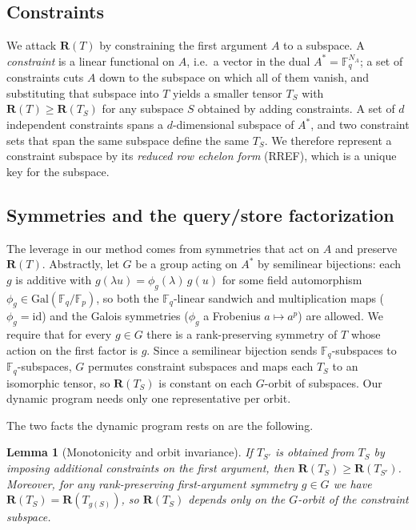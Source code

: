 \documentclass[11pt]{article}
\newtheorem{lemma}{Lemma}
\theoremstyle{definition}
\newcommand{\F}{\mathbb{F}}
\newcommand{\R}{\mathbf{R}}
\newcommand{\Gal}{\mathrm{Gal}}
\begin{document}
\subsection{Constraints}

We attack $\R(T)$ by constraining the first argument $A$ to a subspace. A
\emph{constraint} is a linear functional on $A$, i.e.\ a vector in the dual
$A^* = \F_q^{N_A}$; a set of constraints cuts $A$ down to the subspace on which
all of them vanish, and substituting that subspace into $T$ yields a smaller
tensor $T_S$ with $\R(T)\ge \R(T_S)$ for any subspace $S$ obtained by adding
constraints. A set of $d$ independent constraints spans a $d$-dimensional
subspace of $A^*$, and two constraint sets that span the same subspace define the
same $T_S$. We therefore represent a constraint subspace by its
\emph{reduced row echelon form} (RREF), which is a unique key for the subspace.

\subsection{Symmetries and the query/store factorization}

The leverage in our method comes from symmetries that act on $A$ and preserve
$\R(T)$. Abstractly, let $G$ be a group acting on $A^*$ by semilinear
bijections: each $g$ is additive with $g(\lambda u)=\phi_g(\lambda)\,g(u)$ for
some field automorphism $\phi_g\in\Gal(\F_q/\F_p)$, so both the $\F_q$-linear
sandwich and multiplication maps ($\phi_g=\mathrm{id}$) and the Galois symmetries
($\phi_g$ a Frobenius $a\mapsto a^p$) are allowed. We require that for every
$g\in G$ there is a rank-preserving symmetry of $T$ whose action on the first
factor is $g$. Since a semilinear bijection sends $\F_q$-subspaces to
$\F_q$-subspaces, $G$ permutes constraint subspaces and maps each $T_S$ to an
isomorphic tensor, so $\R(T_S)$ is constant on each $G$-orbit of subspaces. Our
dynamic program needs only one representative per orbit.

The two facts the dynamic program rests on are the following.

\begin{lemma}[Monotonicity and orbit invariance]\label{lem:foundation}
  If $T_{S'}$ is obtained from $T_{S}$ by imposing additional constraints on the first
  argument, then $\R(T_{S})\ge\R(T_{S'})$. Moreover, for any rank-preserving
  first-argument symmetry $g\in G$ we have $\R(T_{S})=\R(T_{g(S)})$, so $\R(T_S)$
  depends only on the $G$-orbit of the constraint subspace.
\end{lemma}
\end{document}
